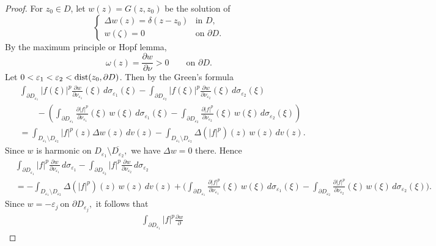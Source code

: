 \documentclass[10pt,a4paper]{amsart}
\begin{document}
\begin{proof}
For $z_{0}\in D$, let $w(z)=G(z, z_{0})$ be the solution of
\[%
\begin{cases}
\Delta w(z)=\delta(z-z_{0}) & \text{in }D,\\
w(\zeta)=0 & \text{on }\partial D.
\end{cases}
\]
By the maximum principle or Hopf lemma,
\[
\omega(z)=\frac{\partial w}{\partial\nu}>0\qquad\text{on }\partial D.
\]
Let $0<\varepsilon_{1}<\varepsilon_{2}<\hbox{dist}(z_{0}, \partial D)$. Then
by the Green's formula
\begin{align*}
&  \int_{\partial D_{\varepsilon_{1}}}|f(\xi)|^{p}\frac{\partial w}%
{\partial\nu_{\varepsilon_{1}}}(\xi)\,d\sigma_{\varepsilon_{1}}(\xi
)-\int_{\partial D_{\varepsilon_{2}}}|f(\xi)|^{p}\frac{\partial w}{\partial
\nu_{\varepsilon_{2}}}(\xi)\,d\sigma_{\varepsilon_{2}}(\xi)\\
&  \qquad-\left(  \int_{\partial D_{\varepsilon_{1}}}\frac{\partial|f|^{p}%
}{\partial\nu_{\varepsilon_{1}}}(\xi)\,w(\xi)\,d\sigma_{\varepsilon_{1}}%
(\xi)-\int_{\partial D_{\varepsilon_{2}}}\frac{\partial|f|^{p}}{\partial
\nu_{\varepsilon_{2}}}(\xi)\,w(\xi)\,d\sigma_{\varepsilon_{2}}(\xi)\right) \\
&  =\int_{D_{\varepsilon_{1}}\setminus D_{\varepsilon_{2}}}|f|^{p}(z)\Delta
w(z)\,dv(z)-\int_{D_{\varepsilon_{1}}\setminus D_{\varepsilon_{2}}}%
\Delta(|f|^{p})(z)\,w(z)\,dv(z).
\end{align*}
Since $w$ is harmonic on $D_{\varepsilon_{1}}\setminus\overline{D_{\varepsilon
_{2}}},$ we have $\Delta w=0$ there. Hence
\begin{align*}
&  \int_{\partial D_{\varepsilon_{1}}}|f|^{p}\frac{\partial w}{\partial
\nu_{\varepsilon_{1}}}\,d\sigma_{\varepsilon_{1}}-\int_{\partial
D_{\varepsilon_{2}}}|f|^{p}\frac{\partial w}{\partial\nu_{\varepsilon_{2}}%
}\,d\sigma_{\varepsilon_{2}}\\
&  =-\int_{D_{\varepsilon_{1}}\setminus D_{\varepsilon_{2}}}\Delta
(|f|^{p})(z)\,w(z)\,dv(z)+\Big(\int_{\partial D_{\varepsilon_{1}}}%
\frac{\partial|f|^{p}}{\partial\nu_{\varepsilon_{1}}}(\xi)\,w(\xi
)\,d\sigma_{\varepsilon_{1}}(\xi)-\int_{\partial D_{\varepsilon_{2}}}%
\frac{\partial|f|^{p}}{\partial\nu_{\varepsilon_{2}}}(\xi)\,w(\xi
)\,d\sigma_{\varepsilon_{2}}(\xi)\Big).
\end{align*}
Since $w=-\varepsilon_{j}\ \text{on }\partial D_{\varepsilon_{j}},$ it
follows that
\begin{align*}
&  \int_{\partial D_{\varepsilon_{1}}}|f|^{p}\frac{\partial w}{\partial
}
\end{align*}
\end{proof}
\end{document}
